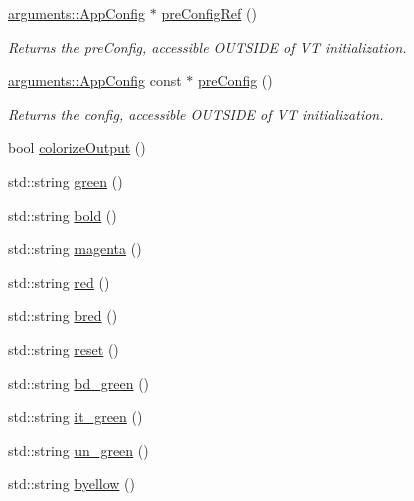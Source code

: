 \begin{DoxyCompactItemize}
\item 
\hyperlink{structvt_1_1arguments_1_1_app_config}{arguments\+::\+App\+Config} $\ast$ \hyperlink{namespacevt_1_1debug_af579167c636c87a9832bba4e05867031}{pre\+Config\+Ref} ()
\begin{DoxyCompactList}\small\item\em Returns the pre\+Config, accessible O\+U\+T\+S\+I\+DE of VT initialization. \end{DoxyCompactList}\item 
\hyperlink{structvt_1_1arguments_1_1_app_config}{arguments\+::\+App\+Config} const  $\ast$ \hyperlink{namespacevt_1_1debug_a852027d87cfb65bb21dd8ce1e8c23c61}{pre\+Config} ()
\begin{DoxyCompactList}\small\item\em Returns the config, accessible O\+U\+T\+S\+I\+DE of VT initialization. \end{DoxyCompactList}\item 
bool \hyperlink{namespacevt_1_1debug_adf5702c2e0469340d30ee8882848f304}{colorize\+Output} ()
\item 
std\+::string \hyperlink{namespacevt_1_1debug_ac88d2f3171c5f622861b5c8ea986f281}{green} ()
\item 
std\+::string \hyperlink{namespacevt_1_1debug_a7a1e7bc4a250917d20840a4d48e27388}{bold} ()
\item 
std\+::string \hyperlink{namespacevt_1_1debug_a1617ac1c602fb27518f6ab8fd4bf99c1}{magenta} ()
\item 
std\+::string \hyperlink{namespacevt_1_1debug_a6b162f2ca1d964d7cf05c4079d5554a0}{red} ()
\item 
std\+::string \hyperlink{namespacevt_1_1debug_ae03a761958b929eaa82f356059f71a46}{bred} ()
\item 
std\+::string \hyperlink{namespacevt_1_1debug_a4456c051bd468fe024334f24887867af}{reset} ()
\item 
std\+::string \hyperlink{namespacevt_1_1debug_a26f95b8d5da98fa54a335789b18fb3d3}{bd\+\_\+green} ()
\item 
std\+::string \hyperlink{namespacevt_1_1debug_a749c31dee324cac600ec442f9f39eb7c}{it\+\_\+green} ()
\item 
std\+::string \hyperlink{namespacevt_1_1debug_aa449a2c29c030d8cd267fd19c0511d5c}{un\+\_\+green} ()
\item 
std\+::string \hyperlink{namespacevt_1_1debug_afb3aac4faf63d7f2aac0d6d142d0b599}{byellow} ()
\item 

\end{DoxyCompactItemize}
